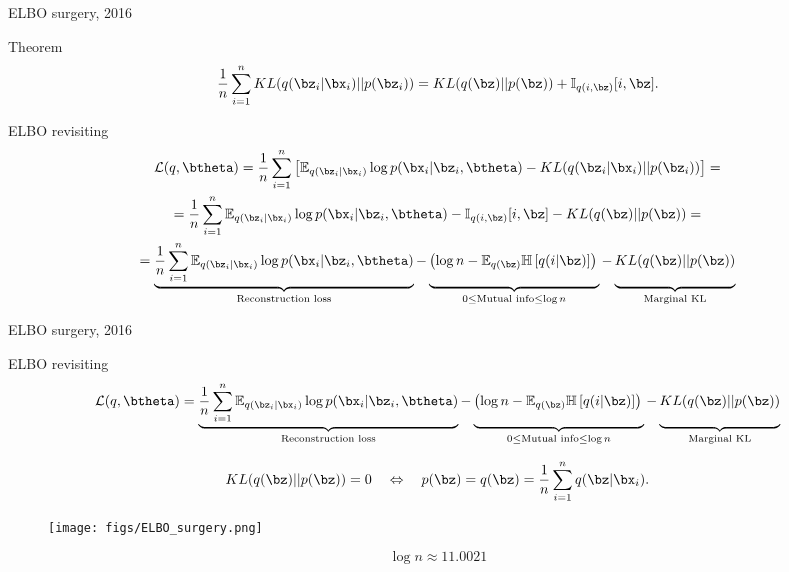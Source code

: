 \begin{frame}{ELBO surgery, 2016}
	\begin{block}{Theorem}
	\[
	    \frac{1}{n} \sum_{i=1}^n KL(q(\bz_i | \bx_i) || p(\bz_i)) = KL(q(\bz) || p(\bz)) + \mathbb{I}_{q(i, \bz)} [i, \bz].
	\]
	\end{block}
	\begin{block}{ELBO revisiting}
	{\footnotesize
	\begin{multline*}
	    \mathcal{L}(q, \btheta) = \frac{1}{n} \sum_{i=1}^n \left[ \mathbb{E}_{q(\bz_i | \bx_i)} \log p(\bx_i | \bz_i, \btheta) - KL(q(\bz_i | \bx_i) || p(\bz_i)) \right] = \\
	    = \frac{1}{n} \sum_{i=1}^n \mathbb{E}_{q(\bz_i | \bx_i)} \log p(\bx_i | \bz_i, \btheta) - \mathbb{I}_{q(i, \bz)} [i, \bz] - KL(q(\bz) || p(\bz)) = \\
	    = \underbrace{\frac{1}{n} \sum_{i=1}^n \mathbb{E}_{q(\bz_i | \bx_i)} \log p(\bx_i | \bz_i, \btheta)}_{\text{Reconstruction loss}} - \underbrace{\left(\log n - \mathbb{E}_{q(\bz)} \mathbb{H} \left[ q(i | \bz) \right] \right)\vphantom{\sum_{i=1}} }_{0 \leq \text{Mutual info} \leq \log n } - \underbrace{KL(q(\bz) || p(\bz))\vphantom{\sum_{i=1}}}_{\text{Marginal KL}}
	\end{multline*}
	}
	\end{block}

\end{frame}
\begin{frame}{ELBO surgery, 2016}
	\begin{block}{ELBO revisiting}
	\vspace{-0.3cm}
	{\footnotesize
	\[
	    \mathcal{L}(q, \btheta) = \underbrace{\frac{1}{n} \sum_{i=1}^n \mathbb{E}_{q(\bz_i | \bx_i)} \log p(\bx_i | \bz_i, \btheta)}_{\text{Reconstruction loss}} - \underbrace{\left(\log n - \mathbb{E}_{q(\bz)} \mathbb{H} \left[ q(i | \bz) \right] \right)\vphantom{\sum_{i=1}}}_{0 \leq \text{Mutual info} \leq \log n } - \underbrace{KL(q(\bz) || p(\bz))\vphantom{\sum_{i=1}}}_{\text{Marginal KL}}
	\]}
	\end{block}
	\vspace{-0.3cm}
	\[
	    KL(q(\bz) || p(\bz)) = 0 \quad \Leftrightarrow \quad p (\bz) = q(\bz) = \frac{1}{n} \sum_{i=1}^n q(\bz | \bx_i).
	\]
	\begin{figure}
	    \centering
	    \texttt{[image: figs/ELBO\_surgery.png]}
	\end{figure}
	\[
	\log n \approx 11.0021
	\]

\end{frame}
